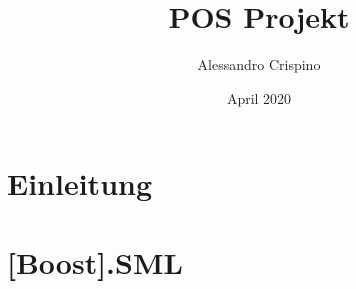 \documentclass{report}
\title{POS Projekt}
\author{Alessandro Crispino}
\date{April 2020}
\begin{document}
\maketitle
\tableofcontents

%

%
%

\chapter{Einleitung}
\chapter{[Boost].SML}
\end{document}
